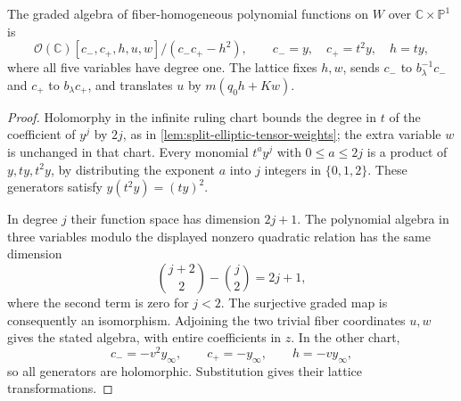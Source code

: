 \begin{lemma}\label{lem:elliptic-zero-ruling-quadric}
The graded algebra of fiber-homogeneous polynomial functions on $W$ over $\mathbb C\times\mathbb P^1$ is
\[
 \mathcal O(\mathbb C)[c_-,c_+,h,u,w]/(c_-c_+-h^2),
 \qquad c_-=y,\quad c_+=t^2y,\quad h=ty,
\]
where all five variables have degree one. The lattice fixes $h,w$, sends $c_-$ to $b_\lambda^{-1}c_-$ and $c_+$ to $b_\lambda c_+$, and translates $u$ by $m(q_0h+Kw)$.
\end{lemma}
\begin{proof}
Holomorphy in the infinite ruling chart bounds the degree in $t$ of the coefficient of $y^j$ by $2j$, as in \cref{lem:split-elliptic-tensor-weights}; the extra variable $w$ is unchanged in that chart. Every monomial $t^ay^j$ with $0\leq a\leq2j$ is a product of $y,ty,t^2y$, by distributing the exponent $a$ into $j$ integers in $\{0,1,2\}$. These generators satisfy $y(t^2y)=(ty)^2$.

In degree $j$ their function space has dimension $2j+1$. The polynomial algebra in three variables modulo the displayed nonzero quadratic relation has the same dimension
\[
 \binom{j+2}{2}-\binom{j}{2}=2j+1,
\]
where the second term is zero for $j<2$. The surjective graded map is consequently an isomorphism. Adjoining the two trivial fiber coordinates $u,w$ gives the stated algebra, with entire coefficients in $z$. In the other chart,
\[
 c_-=-v^2y_\infty,\qquad c_+=-y_\infty,
 \qquad h=-v y_\infty,
\]
so all generators are holomorphic. Substitution gives their lattice transformations.
\end{proof}

